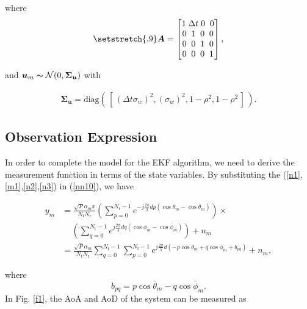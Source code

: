 \documentclass{ieeeaccess}
\begin{document}
where
\begin{align} \label{n44}
\setstretch{.9}
\boldsymbol{A} =
\begin{bmatrix}
1\; \Delta t\;  0\;\;  0\\
0 \;\; 1 \;\; 0\;\; 0\\
0\;\;  0 \;\; 1\;\;  0\\
0\;\;  0 \;\; 0 \;\; 1
\end{bmatrix},
\end{align}

and $\boldsymbol{u}_m\thicksim \mathcal{N}(0,\boldsymbol{\Sigma_u})$ with

\begin{align} \label{n45}
\boldsymbol{\Sigma_u} = \mathrm{diag}(\,[\,(\Delta t\sigma_w)^2, (\sigma_w)^2, 1 - \rho^2, 1 - \rho^2\,]\,).
\end{align}



\subsection{Observation Expression}
In order to complete the model for the EKF algorithm, we need to derive the measurement function in terms of the state variables. 
By substituting the (\ref{n1},\ref{m1},\ref{n2},\ref{n3}) in (\ref{nn10}), we have



 \begin{equation} \label{n47}
\begin{split}
y_m &= \frac{\sqrt{P}\alpha_mx}{N_\textrm{t}N_\textrm{r}}(\sum\limits_{p=0}^{N_\textrm{r}-1}e^{-j\frac{2\pi}{\lambda}dp(\cos\theta_m-\cos\overline{\theta}_m)})\times\\&\,\,\,\,\,\,\,(\sum\limits_{q=0}^{N_\textrm{t}-1}e^{j\frac{2\pi}{\lambda}dq(\cos\phi_m-\cos\overline{\phi}_m)})+ n_m\\
&=\frac{\sqrt{P}\alpha_m}{N_\textrm{t}N_\textrm{r}} \sum\limits_{q=0}^{N_\textrm{t}-1} \sum\limits_{p=0}^{N_\textrm{r}-1}e^{j\frac{2\pi}{\lambda}d(-p\cos\theta_m+q\cos\phi_m+b_{pq})}+ n_m,
\end{split}
\end{equation}

 where
\begin{equation} \label{n48}
b_{pq} = p\cos\overline{\theta}_m- q\cos\overline{\phi}_m.
\end{equation}
In Fig. \ref{f1}, the AoA and AoD of the system can be measured as
\end{document}
